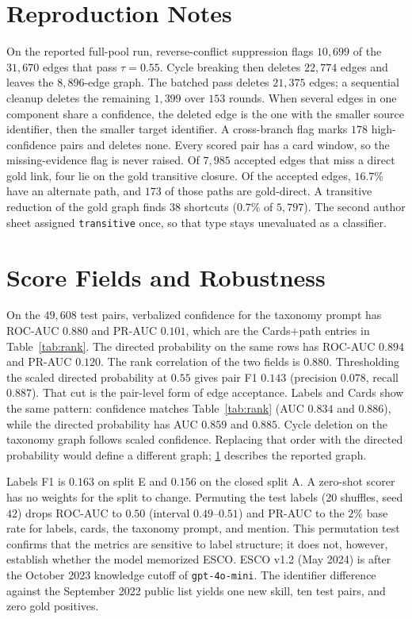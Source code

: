 \documentclass{ws-ijait}
\begin{document}
\section{Reproduction Notes}
\label{app:repro}
On the reported full-pool run, reverse-conflict suppression flags
$10{,}699$ of the $31{,}670$ edges that pass $\tau=0.55$.
Cycle breaking then deletes $22{,}774$ edges and leaves the
$8{,}896$-edge graph.
The batched pass deletes $21{,}375$ edges; a sequential cleanup
deletes the remaining $1{,}399$ over $153$ rounds.
When several edges in one component share a confidence, the deleted
edge is the one with the smaller source identifier, then the smaller
target identifier.
A cross-branch flag marks $178$ high-confidence pairs and deletes
none.
Every scored pair has a card window, so the missing-evidence flag
is never raised.
Of $7{,}985$ accepted edges that miss a direct gold link, four lie
on the gold transitive closure.
Of the accepted edges, $16.7$\% have an alternate path, and $173$
of those paths are gold-direct.
A transitive reduction of the gold graph finds $38$ shortcuts
($0.7$\% of $5{,}797$).
The second author sheet assigned \texttt{transitive} once, so that
type stays unevaluated as a classifier.

\section{Score Fields and Robustness}
\label{app:fields}
On the $49{,}608$ test pairs, verbalized confidence for the
taxonomy prompt has {ROC}-{AUC} $0.880$ and {PR}-{AUC} $0.101$,
which are the Cards$+$path entries in Table~\ref{tab:rank}.
The directed probability on the same rows has {ROC}-{AUC} $0.894$
and {PR}-{AUC} $0.120$.
The rank correlation of the two fields is $0.880$.
Thresholding the scaled directed probability at $0.55$ gives pair
{F1} $0.143$ (precision $0.078$, recall $0.887$).
That cut is the pair-level form of edge acceptance.
Labels and Cards show the same pattern: confidence matches
Table~\ref{tab:rank} ({AUC} $0.834$ and $0.886$), while the directed
probability has {AUC} $0.859$ and $0.885$.
Cycle deletion on the taxonomy graph follows scaled confidence.
Replacing that order with the directed probability would define a
different graph; \ref{app:repro} describes the reported graph.

Labels {F1} is $0.163$ on split E and $0.156$ on the closed split A.
A zero-shot scorer has no weights for the split to change.
Permuting the test labels (20 shuffles, seed $42$) drops {ROC}-{AUC}
to $0.50$ (interval $0.49$--$0.51$) and {PR}-{AUC} to the $2$\% base
rate for labels, cards, the taxonomy prompt, and mention.
This permutation test confirms that the metrics are sensitive to
label structure; it does not, however, establish whether the model
memorized {ESCO}.
{ESCO} v1.2 (May 2024) is after the October 2023 knowledge cutoff of
\texttt{gpt-4o-mini}.
The identifier difference against the September 2022 public list
yields one new skill, ten test pairs, and zero gold positives.
\end{document}
